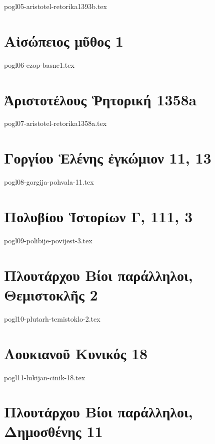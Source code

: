 \documentclass[a4paper,12pt,twoside]{report}
\begin{document}
{pogl05-aristotel-retorika1393b.tex}

\chapter[Αἰσώπειος μῦθος 1]{\textgreek[variant=ancient]{Αἰσώπειος μῦθος} 1}

{pogl06-ezop-basne1.tex}

\chapter[Ἀριστοτέλους Ῥητορική]{\textgreek[variant=ancient]{Ἀριστοτέλους Ῥητορική} 1358a}

{pogl07-aristotel-retorika1358a.tex}

\chapter[Γοργίου Ἑλένης ἐγκώμιον]{\textgreek[variant=ancient]{Γοργίου Ἑλένης ἐγκώμιον} 11, 13}

{pogl08-gorgija-pohvala-11.tex}

\chapter[Πολυβίου Ἱστορίων Γ]{\textgreek[variant=ancient]{Πολυβίου Ἱστορίων Γ,} 111, 3}

{pogl09-polibije-povijest-3.tex}

\chapter[Πλουτάρχου Θεμιστοκλῆς]{\textgreek[variant=ancient]{Πλουτάρχου Βίοι παράλληλοι, \\Θεμιστοκλῆς} 2}

{pogl10-plutarh-temistoklo-2.tex}

\chapter[Λουκιανοῦ Κυνικός]{\textgreek[variant=ancient]{Λουκιανοῦ Κυνικός} 18}

{pogl11-lukijan-cinik-18.tex}

\chapter[Πλουτάρχου Δημοσθένης]{\textgreek[variant=ancient]{Πλουτάρχου Βίοι παράλληλοι, \\Δημοσθένης} 11}
\end{document}
